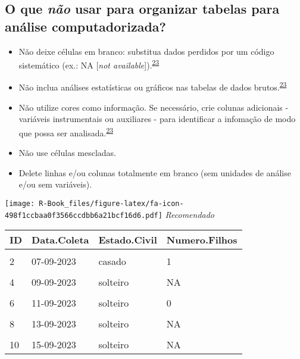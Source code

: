 \documentclass[
]{book}
\begin{document}
\hypertarget{o-que-nuxe3o-usar-para-organizar-tabelas-para-anuxe1lise-computadorizada}{%
\subsection{\texorpdfstring{O que \emph{não} usar para organizar tabelas para análise computadorizada?}{O que não usar para organizar tabelas para análise computadorizada?}}\label{o-que-nuxe3o-usar-para-organizar-tabelas-para-anuxe1lise-computadorizada}}

\begin{itemize}
\item
  Não deixe células em branco: substitua dados perdidos por um código sistemático (ex.: NA {[}\emph{not available}{]}).\textsuperscript{\protect\hyperlink{ref-broman2018}{23}}
\item
  Não inclua análises estatísticas ou gráficos nas tabelas de dados brutos.\textsuperscript{\protect\hyperlink{ref-broman2018}{23}}
\item
  Não utilize cores como informação. Se necessário, crie colunas adicionais - variáveis instrumentais ou auxiliares - para identificar a infomação de modo que possa ser analisada.\textsuperscript{\protect\hyperlink{ref-broman2018}{23}}
\item
  Não use células mescladas.
\item
  Delete linhas e/ou colunas totalmente em branco (sem unidades de análise e/ou sem variáveis).
\end{itemize}

\texttt{[image: R-Book\_files/figure-latex/fa-icon-498f1ccbaa0f3566ccdbb6a21bcf16d6.pdf]} \emph{Recomendado}

\begin{tabu} to 
\toprule
\textbf{ID} & \textbf{Data.Coleta} & \textbf{Estado.Civil} & \textbf{Numero.Filhos}\\
\midrule
{} &  &  & \\
2 & 07-09-2023 & casado & 1\\
 &  &  & \\
4 & 09-09-2023 & solteiro & NA\\
 &  &  & \\
6 & 11-09-2023 & solteiro & 0\\
 &  &  & \\
8 & 13-09-2023 & solteiro & NA\\
 &  &  & \\
10 & 15-09-2023 & solteiro & NA\\
\bottomrule
\end{tabu}
\end{document}
